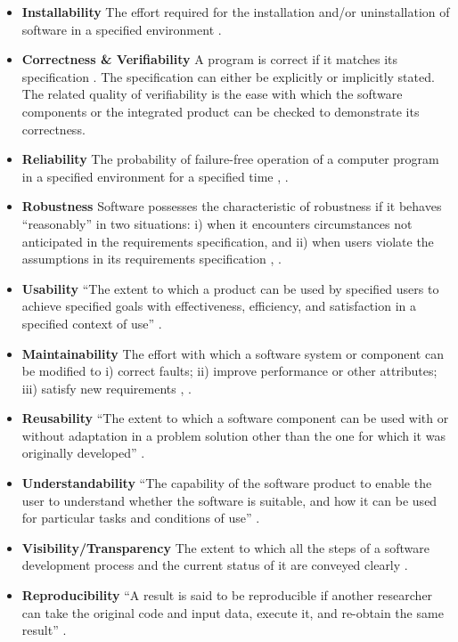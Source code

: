 \documentclass[final, 3p, times, authoryear]{elsarticle}
\begin{document}
\begin{itemize}
	\item \textbf{Installability} The effort required for the installation
    and/or uninstallation of software in a specified environment
    \citep{ISO/IEC25010, lenhard2013measuring}.

	\item \textbf{Correctness \& Verifiability} A program is correct if it
    matches its specification \citep[p.\ 17]{GhezziEtAl2003}.  The specification
    can either be explicitly or implicitly stated.  The related quality of
    verifiability is the ease with which the software components or the
    integrated product can be checked to demonstrate its correctness. 

	\item \textbf{Reliability} The probability of failure-free operation of a
	computer program in a specified environment for a specified time \citep{musa1987software}, \citep[p.\ 357]{GhezziEtAl2003}.

	\item \textbf{Robustness} Software possesses the characteristic of
	robustness if it behaves ``reasonably'' in two situations: i) when it
	encounters circumstances not anticipated in the requirements specification,
	and ii) when users violate the assumptions in its requirements specification 
	\citep[p.\ 19]{GhezziEtAl2003}, \citep{boehm2007software}.

	\item \textbf{Usability} ``The extent to which a product can be used by
	specified users to achieve specified goals with effectiveness, efficiency,
	and satisfaction in a specified context of use'' \citep{ISO/TR16982:2002}
	\citep{ISO9241-11:2018}.

	\item \textbf{Maintainability} The effort with which a software system or
	component can be modified to i) correct faults; ii) improve performance or
	other attributes; iii) satisfy new requirements
	\citep{IEEEStdGlossarySET1990}, \citep{boehm2007software}.

	\item \textbf{Reusability} ``The extent to which a software component can be
	used with or without adaptation in a problem solution other than the one for
	which it was originally developed'' \citep{kalagiakos2003non}.

	\item \textbf{Understandability} ``The capability of the software product to
	enable the user to understand whether the software is suitable, and how it
	can be used for particular tasks and conditions of use'' \citep{iso2001iec}.

	\item \textbf{Visibility/Transparency} The extent to which all the steps
	of a software development process and the current status of it are conveyed
	clearly \citep[p.\ 32]{GhezziEtAl2003}.

	\item \textbf{Reproducibility} ``A result is said to be reproducible if
	another researcher can take the original code and input data, execute it,
	and re-obtain the same result'' \citep{BenureauAndRougier2017}.
\end{itemize}
\end{document}
